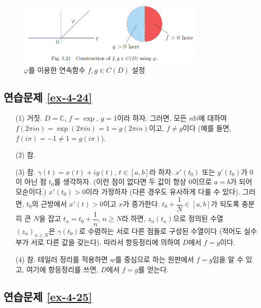 \begin{figure}[h!]
\begin{center}
\includegraphics[width=0.8\textwidth]{./Solution/figs/fig-5-21}
\end{center}
\caption{$\varphi$를 이용한 연속함수 $f,g\in C(D)$ 설정
}
\label{fig-5-21}
\end{figure}

\subsection*{연습문제 \ref{ex-4-24}}

\begin{itemize}
\item[(1)]   거짓.
$D=\mathbb C$, $f=\exp$, $g=1$이라 하자.
그러면, 모든 $n\mathbb N$에 대하여
$f(2\pi i n) = \exp(2\pi i n) = 1 = g(2\pi i n)$이고,
$f\ne g$이다 (예를 들면, $f(i\pi) = -1 \ne 1 = g(i\pi)$).
\item[(2)] 참.
\item[(3)] 참. 
$\gamma(t) = x(t) +iy(t)$, $t\in[a,b]$라 하자.
$x'(t_0)$ 또는 $y'(t_0)$가 $0$이 아닌 점 $t_0$를 생각하자.
(이런 점이 없다면 두 값이 항상 $0$이므로 $a=b$가 되어 모순이다.)
$x'(t_0)>0$이라 가정하자 (다른 경우도 유사하게 다룰 수 있다).
그러면, $t_0$의 근방에서 $x'(t)>0$이고 $x$가 증가한다.
$t_0+\dfrac1N\in [a,b]$가 되도록 충분히 큰 $N$을 잡고 $t_n = t_0 + \dfrac1n$, $n\ge N$라 하면,
$z_n(t_n)$으로 정의된 수열 $(z_n)_{n\ge N}$은 $\gamma(t_0)$로 수렴하는
서로 다른 점들로 구성된 수열이다 (적어도 실수부가 서로 다른 값을 갖는다).
따라서 항등정리에 의하여 $D$에서 $f=g$이다.
\item[(4)] 참. 
테일러 정리를 적용하면 $w$를 중심으로 하는 원판에서 $ f=g$임을 알 수 있고,
여기에 항등정리를 쓰면, $D$에서 $f=g$를 얻는다.
\end{itemize}

\subsection*{연습문제 \ref{ex-4-25}}


